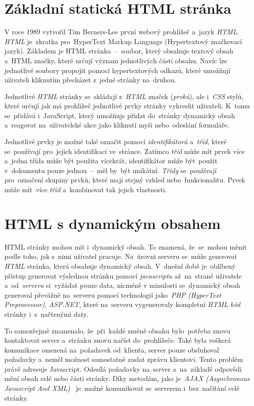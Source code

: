 \documentclass[11pt,a4paper]{report}
\begin{document}
        \section{Základní statická HTML stránka}
            V roce 1989 vytvořil Tim Berners-Lee první webový prohlížeč a~jazyk \emph{HTML}. \emph{HTML} je~zkratka pro~HyperText Markup Language (Hypertextový značkovací jazyk). Základem je HTML stránka~--~soubor, který obsahuje textový obsah a~HTML značky, které určují význam jednotlivých částí obsahu. Navíc lze jednotlivé soubory propojit pomocí hypertextových odkazů, které umožňují uživateli kliknutím přecházet z~jedné stránky na~druhou.

            Jednotlivé \emph{HTML} stránky se~skládají z~\emph{HTML} značek (\emph{prvků}), ale i~\emph{CSS} stylů, které určují jak má prohlížeč jednotlivé prvky stránky vykreslit uživateli. K~tomu se~přidává i~JavaScript, který umožňuje přidat do~stránky dynamický obsah a~reagovat na~uživatelské akce jako kliknutí myši nebo~odeslání formuláře. \cite{berners:1989:proposal}

            Jednotlivé prvky je možné také označit pomocí \emph{identifikátorů} a~\emph{tříd}, které se~používají pro~jejich identifikaci ve~stránce. Zatímco \emph{tříd} může mít prvek více a~jedna třída může být použita vícekrát, identifikátor může být~použit v~dokumentu pouze jednou~--~měl by~být unikátní. \emph{Třídy} se~používají pro~označení skupiny prvků, které mají stejný vzhled nebo~funkcionalitu. Prvek může mít~více \emph{tříd} a~kombinovat tak jejich vlastnosti. \cite{jpw:tridy}

        \section{HTML s dynamickým obsahem}
            HTML stránky mohou mít i~dynamický obsah. To znamená, že~se~mohou měnit podle toho, jak s~nimi uživatel pracuje. Na~úrovni serveru se~může generovat \emph{HTML} stránka, která obsahuje dynamický obsah. V~dnešní době je~oblíbený přístup generovat výslednou stránku pomocí \emph{javascriptu} až~na~straně uživatele a~od~\emph{serveru} si~vyžádat pouze data, nicméně v minulosti se~dynamický obsah generoval převážně na~serveru pomocí technologií jako~\emph{PHP (HyperText Preprocessor)}, \emph{ASP.NET}, které na~serveru vygenerovaly kompletní \emph{HTML kód} stránky i~s~načtenými daty.

            To samozřejmě znamenalo, že~při~každé změně obsahu bylo~potřeba znovu kontaktovat server a~stránku znovu načíst do~prohlížeče. Také byla veškerá komunikace omezená na~požadavek od~klienta, server pouze obsluhoval požadavky a~neměl možnost samostatně zaslat zprávu klientovi. Tento problém právě adresuje Javascript. Odesílá požadavky na~server a~na~základě odpovědi mění obsah celé nebo části stránky. Díky metodám, jako je~\emph{AJAX (Asynchronous Javascript And XML)}~\cite{ajax:mdn} je~možné komunikovat se~serverem i~bez~načítání celé stránky.
\end{document}
